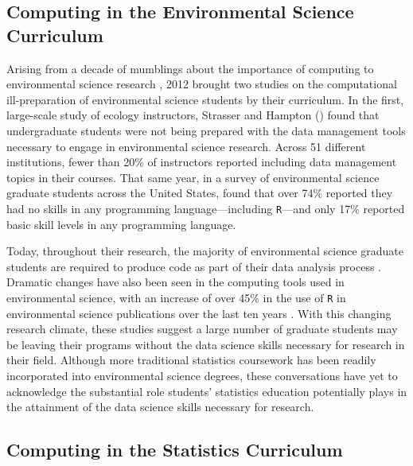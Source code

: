 \documentclass[12pt]{article}
\begin{document}
\subsection{Computing in the Environmental Science Curriculum}

\noindent Arising from a decade of mumblings about the importance of computing
to environmental science research \citep{andelman, dodds1, dodds2, eglen, 
green, hastings, kelling, wilson-software-carpentry, wilson, wing}, 2012 brought
two studies on the computational ill-preparation of environmental science 
students by their curriculum. In the first, large-scale study of ecology
instructors, Strasser and Hampton (\citeyear{labs}) found that undergraduate
students were not being prepared with the data management tools necessary to
engage in environmental science research. Across 51 different institutions, 
fewer than 20\% of instructors reported including data management topics in
their courses. That same year, in a survey of environmental science graduate
students across the United States, \citet{hernandez} found that over 74\%
reported they had no skills in any programming language---including 
\texttt{R}---and only 17\% reported basic skill levels in any programming
language. 

\quad Today, throughout their research, the majority of environmental science
graduate students are required to produce code as part of their data analysis
process \citep{mislan}. Dramatic changes have also been seen in the 
computing tools used in environmental science, with an increase of over 45\% in
the use of \texttt{R} in environmental science publications over the last ten 
years \citep{Rpopular}. With this changing research climate, these studies
suggest a large number of graduate students may be leaving their programs 
without the data science skills necessary for research in their field. Although 
more traditional statistics coursework has been readily incorporated into
environmental science degrees, these conversations have yet to acknowledge the
substantial role students' statistics education potentially plays in the
attainment of the data science skills necessary for research.


\subsection{Computing in the Statistics Curriculum}
\end{document}
